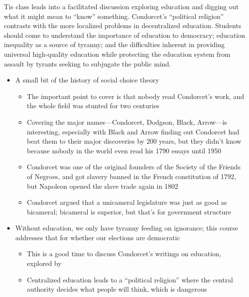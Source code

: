 \begin{boxcomment}
    Tis class leads into a facilitated discussion exploring education and digging out what it might mean to ``know'' something.  Condorcet's ``political religion'' contrasts with the more localized problems in decentralized education.  Students should come to understand the importance of education to democracy; education inequality as a source of tyranny; and the difficulties inherent in providing universal high-quality education while protecting the education system from assault by tyrants seeking to subjugate the public mind.
\end{boxcomment}

\begin{itemize}
    \item A small bit of the history of social choice theory
    \begin{itemize}
        \item The important point to cover is that nobody read Condorcet's work, and the whole field was stunted for two centuries

        \item Covering the major names—Condorcet, Dodgson, Black, Arrow—is interesting, especially with Black and Arrow finding out Condorcet had beat them to their major discoveries by 200 years, but they didn't know because nobody in the world even read his 1790 essays until 1950

        \item Condorcet was one of the original founders of the Society of the Friends of Negroes, and got slavery banned in the French constitution of 1792, but Napoleon opened the slave trade again in 1802

        \item Condorcet argued that a unicameral legislature was just as good as bicameral; bicameral is superior, but that's for government structure
    \end{itemize}

    \item Without education, we only have tyranny feeding on ignorance; this course addresses that for whether our elections are democratic
    \begin{itemize}
        \item This is a good time to discuss Condorcet's writings on education, explored by \autocite{Yastrebtseva2015}

        \item Centralized education leads to a ``political religion'' where the central authority decides what people will think, which is dangerous


\end{itemize}
\end{itemize}

